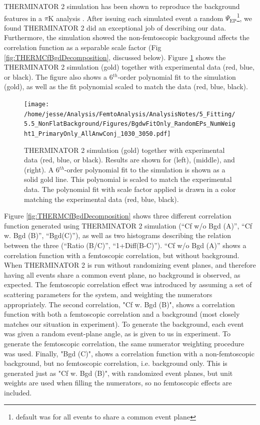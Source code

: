 \documentclass[/home/jesse/Analysis/FemtoAnalysis/AnalysisNotes/AnalysisNoteJBuxton.tex]{subfiles}
\begin{document}
THERMINATOR 2 simulation has been shown to reproduce the background features in a $\pi$K analysis \cite{Kisiel:2017}.  
After issuing each simulated event a random $\Psi_{\mathrm{EP}}$\footnote{default was for all events to share a common event plane}, we found THERMINATOR 2 did an exceptional job of describing our data.  
Furthermore, the simulation showed the non-femtoscopic background affects the correlation function as a separable scale factor (Fig \ref{fig:THERMCfBgdDecomposition}, discussed below).
Figure \ref{fig:BgdswTHERM} shows the THERMINATOR 2 simulation (gold) together with experimental data (red, blue, or black).  
The figure also shows a 6$^{th}$-order polynomial fit to the simulation (gold), as well as the fit polynomial scaled to match the data (red, blue, black).


\begin{figure}[h]
  \centering
  \texttt{[image: /home/jesse/Analysis/FemtoAnalysis/AnalysisNotes/5\_Fitting/5.5\_NonFlatBackground/Figures/BgdwFitOnly\_RandomEPs\_NumWeight1\_PrimaryOnly\_AllAnwConj\_1030\_3050.pdf]}
  \caption[Backgrounds with THERMINATOR 2]
  {
  THERMINATOR 2 simulation (gold) together with experimental data (red, blue, or black).  
  Results are shown for \LamKchP (left), \LamKchM (middle), and \LamKs (right).
  A 6$^{th}$-order polynomial fit to the simulation is shown as a solid gold line.  
  This polynomial is scaled to match the experimental data.  
  The polynomial fit with scale factor applied is drawn in a color matching the experimental data (red, blue, black).
  }
  \label{fig:BgdswTHERM}
\end{figure} 

Figure \ref{fig:THERMCfBgdDecomposition} shows three different correlation function generated using THERMINATOR 2 simulation (``Cf w/o Bgd (A)'', ``Cf w. Bgd (B)'', ``Bgd(C)''), as well as two histograms describing the relation between the three (``Ratio (B/C)'', ``1+Diff(B-C)'').  
``Cf w/o Bgd (A)'' shows a correlation function with a femtoscopic correlation, but without background.  
When THERMINATOR 2 is run without randomizing event planes, and therefore having all events share a common event plane, no background is observed, as expected.  
The femtoscopic correlation effect was introduced by assuming a set of scattering parameters for the system, and weighting the numerators appropriately.  
The second correlation, "Cf w. Bgd (B)", shows a correlation function with both a femtoscopic correlation and a background (most closely matches our situation in experiment).  
To generate the background, each event was given a random event-plane angle, as is given to us in experiment.  
To generate the femtoscopic correlation, the same numerator weighting procedure was used.  
Finally, "Bgd (C)", shows a correlation function with a non-femtoscopic background, but no femtoscopic correlation, i.e. background only.  
This is generated just as "Cf w. Bgd (B)", with randomized event planes, but unit weights are used when filling the numerators, so no femtoscopic effects are included.
\end{document}
